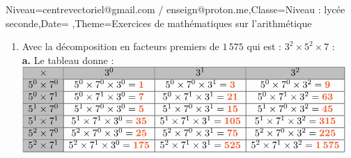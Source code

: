 \documentclass[a4paper,11pt,fleqn]{article}
\begin{document}
\begin{Maquette}[Fiche]{Niveau=centrevectoriel@gmail.com / enseign@proton.me,Classe=Niveau :  lycée seconde,Date=   ,Theme=Exercices de mathématiques  sur l'arithmétique }
\begin{Solution}
\begin{enumerate}[itemsep=1em]
	\item Avec la décomposition en facteurs premiers de $1\,575$ qui est : $3^{2}\times 5^{2}\times 7$ : \\\textbf {a.}  Le tableau donne :\\$\renewcommand{\arraystretch}{1}
\begin{array}{|c|c|c|c|}
\hline
\cellcolor{lightgray} \times & \cellcolor{lightgray} 3^{0} & \cellcolor{lightgray} 3^{1} & \cellcolor{lightgray} 3^{2}\\
\hline
\cellcolor{lightgray} 5^{0}\times7^{0} & 5^{0}\times7^{0}\times3^{0}={\color[HTML]{f15929}\boldsymbol{1}} & 5^{0}\times7^{0}\times3^{1}={\color[HTML]{f15929}\boldsymbol{3}} & 5^{0}\times7^{0}\times3^{2}={\color[HTML]{f15929}\boldsymbol{9}}\\
\hline
\cellcolor{lightgray} 5^{0}\times7^{1} & 5^{0}\times7^{1}\times3^{0}={\color[HTML]{f15929}\boldsymbol{7}} & 5^{0}\times7^{1}\times3^{1}={\color[HTML]{f15929}\boldsymbol{21}} & 5^{0}\times7^{1}\times3^{2}={\color[HTML]{f15929}\boldsymbol{63}}\\
\hline
\cellcolor{lightgray} 5^{1}\times7^{0} & 5^{1}\times7^{0}\times3^{0}={\color[HTML]{f15929}\boldsymbol{5}} & 5^{1}\times7^{0}\times3^{1}={\color[HTML]{f15929}\boldsymbol{15}} & 5^{1}\times7^{0}\times3^{2}={\color[HTML]{f15929}\boldsymbol{45}}\\
\hline
\cellcolor{lightgray} 5^{1}\times7^{1} & 5^{1}\times7^{1}\times3^{0}={\color[HTML]{f15929}\boldsymbol{35}} & 5^{1}\times7^{1}\times3^{1}={\color[HTML]{f15929}\boldsymbol{105}} & 5^{1}\times7^{1}\times3^{2}={\color[HTML]{f15929}\boldsymbol{315}}\\
\hline
\cellcolor{lightgray} 5^{2}\times7^{0} & 5^{2}\times7^{0}\times3^{0}={\color[HTML]{f15929}\boldsymbol{25}} & 5^{2}\times7^{0}\times3^{1}={\color[HTML]{f15929}\boldsymbol{75}} & 5^{2}\times7^{0}\times3^{2}={\color[HTML]{f15929}\boldsymbol{225}}\\
\hline
\cellcolor{lightgray} 5^{2}\times7^{1} & 5^{2}\times7^{1}\times3^{0}={\color[HTML]{f15929}\boldsymbol{175}} & 5^{2}\times7^{1}\times3^{1}={\color[HTML]{f15929}\boldsymbol{525}} & 5^{2}\times7^{1}\times3^{2}={\color[HTML]{f15929}\boldsymbol{1\,575}}\\
\hline
\end{array}
\renewcommand{\arraystretch}{1}$

\end{enumerate}
\end{Solution}
\end{Maquette}
\end{document}
